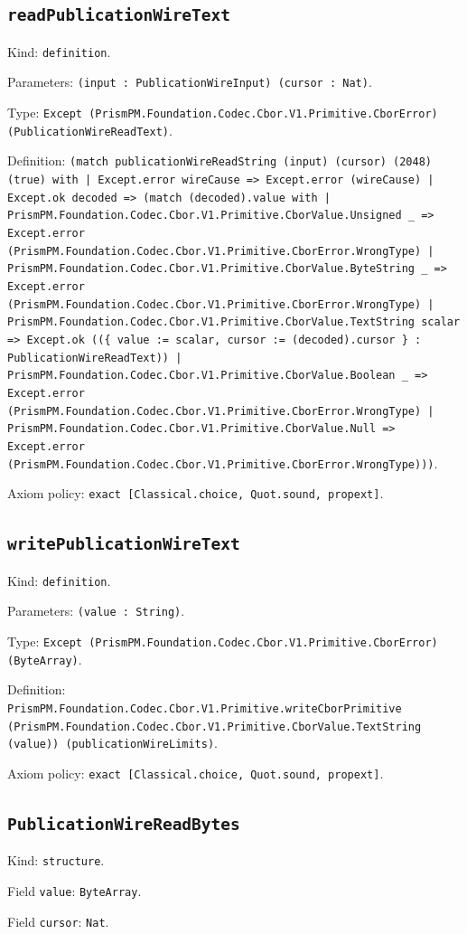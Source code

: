 \documentclass[11pt]{article}
\begin{document}
\subsection*{\texttt{readPublicationWireText}}
\noindent Kind: \texttt{definition}.\par
\noindent Parameters: \texttt{(input : PublicationWireInput) (cursor : Nat)}.\par
\noindent Type: \texttt{Except (PrismPM.Foundation.Codec.Cbor.V1.Primitive.CborError) (PublicationWireReadText)}.\par
\noindent Definition: \texttt{(match publicationWireReadString (input) (cursor) (2048) (true) with | Except.error wireCause => Except.error (wireCause) | Except.ok decoded => (match (decoded).value with | PrismPM.Foundation.Codec.Cbor.V1.Primitive.CborValue.Unsigned \_ => Except.error (PrismPM.Foundation.Codec.Cbor.V1.Primitive.CborError.WrongType) | PrismPM.Foundation.Codec.Cbor.V1.Primitive.CborValue.ByteString \_ => Except.error (PrismPM.Foundation.Codec.Cbor.V1.Primitive.CborError.WrongType) | PrismPM.Foundation.Codec.Cbor.V1.Primitive.CborValue.TextString scalar => Except.ok ((\{ value := scalar, cursor := (decoded).cursor \} : PublicationWireReadText)) | PrismPM.Foundation.Codec.Cbor.V1.Primitive.CborValue.Boolean \_ => Except.error (PrismPM.Foundation.Codec.Cbor.V1.Primitive.CborError.WrongType) | PrismPM.Foundation.Codec.Cbor.V1.Primitive.CborValue.Null => Except.error (PrismPM.Foundation.Codec.Cbor.V1.Primitive.CborError.WrongType)))}.\par
\noindent Axiom policy: \texttt{exact [Classical.choice, Quot.sound, propext]}.\par
\subsection*{\texttt{writePublicationWireText}}
\noindent Kind: \texttt{definition}.\par
\noindent Parameters: \texttt{(value : String)}.\par
\noindent Type: \texttt{Except (PrismPM.Foundation.Codec.Cbor.V1.Primitive.CborError) (ByteArray)}.\par
\noindent Definition: \texttt{PrismPM.Foundation.Codec.Cbor.V1.Primitive.writeCborPrimitive (PrismPM.Foundation.Codec.Cbor.V1.Primitive.CborValue.TextString (value)) (publicationWireLimits)}.\par
\noindent Axiom policy: \texttt{exact [Classical.choice, Quot.sound, propext]}.\par
\subsection*{\texttt{PublicationWireReadBytes}}
\noindent Kind: \texttt{structure}.\par
\noindent Field \texttt{value}: \texttt{ByteArray}.\par
\noindent Field \texttt{cursor}: \texttt{Nat}.\par
\end{document}
